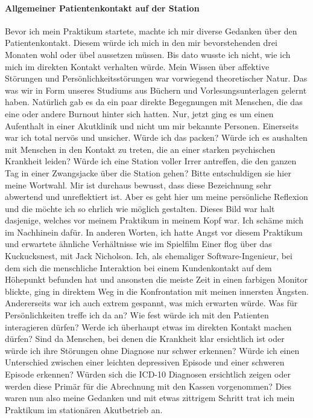 \paragraph{Allgemeiner Patientenkontakt auf der Station}
Bevor ich mein Praktikum startete, machte ich mir diverse Gedanken über den Patientenkontakt. Diesem würde ich mich in den mir bevorstehenden drei Monaten wohl oder übel aussetzen müssen. Bis dato wusste ich nicht, wie ich mich im direkten Kontakt verhalten würde. Mein Wissen über affektive Störungen und Persönlichkeitsstörungen war vorwiegend theoretischer Natur. Das was wir in Form unseres Studiums aus Büchern und Vorlesungsunterlagen gelernt haben. Natürlich gab es da ein paar direkte Begegnungen mit Menschen, die das eine oder andere \glqq Burnout\grqq{} hinter sich hatten. Nur, jetzt ging es um einen Aufenthalt in einer Akutklinik und nicht um mir bekannte Personen. Einerseits war ich total nervös und unsicher. Würde ich das packen? Würde ich es aushalten mit Menschen in den Kontakt zu treten, die an einer starken psychischen Krankheit leiden? Würde ich eine Station voller Irrer antreffen, die den ganzen Tag in einer Zwangsjacke über die Station gehen? Bitte entschuldigen sie hier meine Wortwahl. Mir ist durchaus bewusst, dass diese Bezeichnung sehr abwertend und unreflektiert ist. Aber es geht hier um meine persönliche Reflexion und die möchte ich so ehrlich wie möglich gestalten. Dieses Bild war halt dasjenige, welches vor meinem Praktikum in meinem Kopf war. Ich schäme mich im Nachhinein dafür. In anderen Worten, ich hatte Angst vor diesem Praktikum und erwartete ähnliche Verhältnisse wie im Spielfilm \glqq Einer flog über das Kuckucksnest\grqq{}, mit Jack Nicholson. Ich, als ehemaliger Software-Ingenieur, bei dem sich die menschliche Interaktion bei einem Kundenkontakt auf dem Höhepunkt befunden hat und ansonsten die meiste Zeit in einen farbigen Monitor blickte, ging in direktem Weg in die Konfrontation mit meinen innersten Ängsten. Andererseits war ich auch extrem gespannt, was mich erwarten würde. Was für Persönlichkeiten treffe ich da an? Wie fest würde ich mit den Patienten interagieren dürfen? Werde ich überhaupt etwas im direkten Kontakt machen dürfen? Sind da Menschen, bei denen die Krankheit klar ersichtlich ist oder würde ich ihre Störungen ohne Diagnose nur schwer erkennen? Würde ich einen Unterschied zwischen einer leichten depressiven Episode und einer schweren Episode erkennen? Würden sich die ICD-10 Diagnosen ersichtlich zeigen oder werden diese Primär für die Abrechnung mit den Kassen vorgenommen? Dies waren nun also meine Gedanken und mit etwas zittrigem Schritt trat ich mein Praktikum im stationären Akutbetrieb an.


